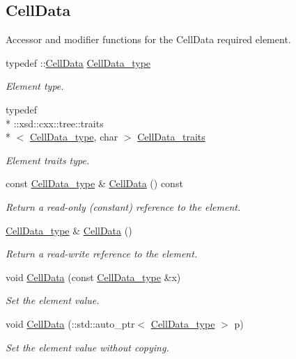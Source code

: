 \subsection*{Cell\+Data}
\label{_amgrp007b3d9997e1a909fe32a9f90c4a9977}%
Accessor and modifier functions for the Cell\+Data required element. \begin{DoxyCompactItemize}
\item 
typedef \+::\hyperlink{classCellData}{Cell\+Data} \hyperlink{classPieceUnstructuredGrid__t_a4232a7b88477ee6f692a4e5fab6a65d1}{Cell\+Data\+\_\+type}
\begin{DoxyCompactList}\small\item\em Element type. \end{DoxyCompactList}\item 
typedef \\*
\+::xsd\+::cxx\+::tree\+::traits\\*
$<$ \hyperlink{classPieceUnstructuredGrid__t_a4232a7b88477ee6f692a4e5fab6a65d1}{Cell\+Data\+\_\+type}, char $>$ \hyperlink{classPieceUnstructuredGrid__t_a0e04d369c16993da7e5e2a7152c2e518}{Cell\+Data\+\_\+traits}
\begin{DoxyCompactList}\small\item\em Element traits type. \end{DoxyCompactList}\item 
const \hyperlink{classPieceUnstructuredGrid__t_a4232a7b88477ee6f692a4e5fab6a65d1}{Cell\+Data\+\_\+type} \& \hyperlink{classPieceUnstructuredGrid__t_a7c7be2b175fa0ec2fc403bb4740865c1}{Cell\+Data} () const 
\begin{DoxyCompactList}\small\item\em Return a read-\/only (constant) reference to the element. \end{DoxyCompactList}\item 
\hyperlink{classPieceUnstructuredGrid__t_a4232a7b88477ee6f692a4e5fab6a65d1}{Cell\+Data\+\_\+type} \& \hyperlink{classPieceUnstructuredGrid__t_a679db045d830876cce6fe04767e7c611}{Cell\+Data} ()
\begin{DoxyCompactList}\small\item\em Return a read-\/write reference to the element. \end{DoxyCompactList}\item 
void \hyperlink{classPieceUnstructuredGrid__t_a6fd0984f28544ef312e860cac18e7144}{Cell\+Data} (const \hyperlink{classPieceUnstructuredGrid__t_a4232a7b88477ee6f692a4e5fab6a65d1}{Cell\+Data\+\_\+type} \&x)
\begin{DoxyCompactList}\small\item\em Set the element value. \end{DoxyCompactList}\item 
void \hyperlink{classPieceUnstructuredGrid__t_af669b0f503d52e5edc2cc0665dc64721}{Cell\+Data} (\+::std\+::auto\+\_\+ptr$<$ \hyperlink{classPieceUnstructuredGrid__t_a4232a7b88477ee6f692a4e5fab6a65d1}{Cell\+Data\+\_\+type} $>$ p)
\begin{DoxyCompactList}\small\item\em Set the element value without copying. \end{DoxyCompactList}\end{DoxyCompactItemize}
